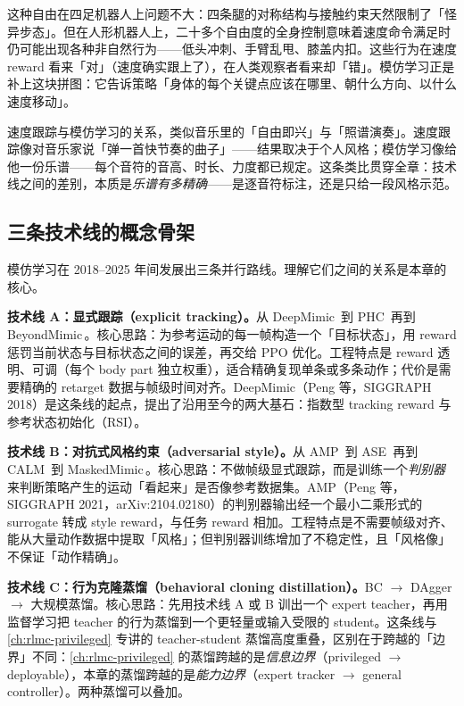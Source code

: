 这种自由在四足机器人上问题不大：四条腿的对称结构与接触约束天然限制了「怪异步态」。但在人形机器人上，二十多个自由度的全身控制意味着速度命令满足时仍可能出现各种非自然行为——低头冲刺、手臂乱甩、膝盖内扣。这些行为在速度 reward 看来「对」（速度确实跟上了），在人类观察者看来却「错」。模仿学习正是补上这块拼图：它告诉策略「身体的每个关键点应该在哪里、朝什么方向、以什么速度移动」。

\begin{insight}\label{ins:rlmc-imit-score}
速度跟踪与模仿学习的关系，类似音乐里的「自由即兴」与「照谱演奏」。速度跟踪像对音乐家说「弹一首快节奏的曲子」——结果取决于个人风格；模仿学习像给他一份乐谱——每个音符的音高、时长、力度都已规定。这条类比贯穿全章：技术线之间的差别，本质是\emph{乐谱有多精确}——是逐音符标注，还是只给一段风格示范。
\end{insight}

\subsection{三条技术线的概念骨架}
\label{sec:rlmc-imit-lines-three}

模仿学习在 2018--2025 年间发展出三条并行路线。理解它们之间的关系是本章的核心。

\textbf{技术线 A：显式跟踪（explicit tracking）。}从 DeepMimic\,\cite{peng2018deepmimic} 到 PHC\,\cite{luo2023phc} 再到 BeyondMimic\,\cite{liao2025beyondmimic}。核心思路：为参考运动的每一帧构造一个「目标状态」，用 reward 惩罚当前状态与目标状态之间的误差，再交给 PPO 优化。工程特点是 reward 透明、可调（每个 body part 独立权重），适合精确复现单条或多条动作；代价是需要精确的 retarget 数据与帧级时间对齐。DeepMimic（Peng 等，SIGGRAPH 2018）是这条线的起点，提出了沿用至今的两大基石：指数型 tracking reward 与参考状态初始化（RSI）。

\textbf{技术线 B：对抗式风格约束（adversarial style）。}从 AMP\,\cite{peng2021amp} 到 ASE\,\cite{peng2022ase} 再到 CALM\,\cite{tessler2023calm} 到 MaskedMimic\,\cite{tessler2024maskedmimic}。核心思路：不做帧级显式跟踪，而是训练一个\emph{判别器}来判断策略产生的运动「看起来」是否像参考数据集。AMP（Peng 等，SIGGRAPH 2021，arXiv:2104.02180）的判别器输出经一个最小二乘形式的 surrogate 转成 style reward，与任务 reward 相加。工程特点是不需要帧级对齐、能从大量动作数据中提取「风格」；但判别器训练增加了不稳定性，且「风格像」不保证「动作精确」。

\textbf{技术线 C：行为克隆蒸馏（behavioral cloning distillation）。}BC $\to$ DAgger $\to$ 大规模蒸馏。核心思路：先用技术线 A 或 B 训出一个 expert teacher，再用监督学习把 teacher 的行为蒸馏到一个更轻量或输入受限的 student。这条线与 \cref{ch:rlmc-privileged} 专讲的 teacher-student 蒸馏高度重叠，区别在于跨越的「边界」不同：\cref{ch:rlmc-privileged} 的蒸馏跨越的是\emph{信息边界}（privileged $\to$ deployable），本章的蒸馏跨越的是\emph{能力边界}（expert tracker $\to$ general controller）。两种蒸馏可以叠加。

